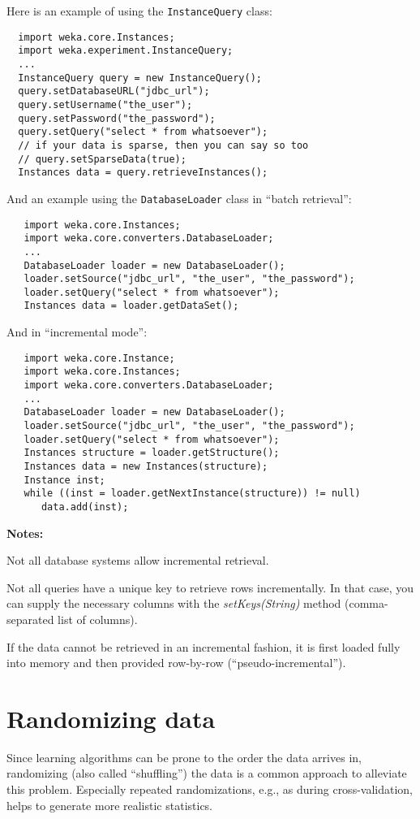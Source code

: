 \noindent Here is an example of using the \texttt{InstanceQuery} class:
\begin{verbatim}
  import weka.core.Instances;
  import weka.experiment.InstanceQuery;
  ...
  InstanceQuery query = new InstanceQuery();
  query.setDatabaseURL("jdbc_url");
  query.setUsername("the_user");
  query.setPassword("the_password");
  query.setQuery("select * from whatsoever");
  // if your data is sparse, then you can say so too
  // query.setSparseData(true);
  Instances data = query.retrieveInstances();
\end{verbatim}
And an example using the \texttt{DatabaseLoader} class in ``batch retrieval'':
\begin{verbatim}
   import weka.core.Instances;
   import weka.core.converters.DatabaseLoader;
   ...
   DatabaseLoader loader = new DatabaseLoader();
   loader.setSource("jdbc_url", "the_user", "the_password");
   loader.setQuery("select * from whatsoever");
   Instances data = loader.getDataSet();
\end{verbatim}

\samepage
\noindent And in ``incremental mode'':
\begin{verbatim}
   import weka.core.Instance;
   import weka.core.Instances;
   import weka.core.converters.DatabaseLoader;
   ...
   DatabaseLoader loader = new DatabaseLoader();
   loader.setSource("jdbc_url", "the_user", "the_password");
   loader.setQuery("select * from whatsoever");
   Instances structure = loader.getStructure();
   Instances data = new Instances(structure);
   Instance inst;
   while ((inst = loader.getNextInstance(structure)) != null)
      data.add(inst);
\end{verbatim}
\textbf{Notes:}
\begin{tight_itemize}
	\item Not all database systems allow incremental retrieval.
	\item Not all queries have a unique key to retrieve rows incrementally. In
that case, you can supply the necessary columns with the
\textit{setKeys(String)} method (comma-separated list of columns).
	\item If the data cannot be retrieved in an incremental fashion, it is first
loaded fully into memory and then provided row-by-row (``pseudo-incremental'').
\end{tight_itemize}

\newpage

\section{Randomizing data}
Since learning algorithms can be prone to the order the data arrives
in, randomizing (also called ``shuffling'') the data is a common approach to
alleviate this problem. Especially repeated randomizations, e.g., as during
cross-validation, helps to generate more realistic statistics.

